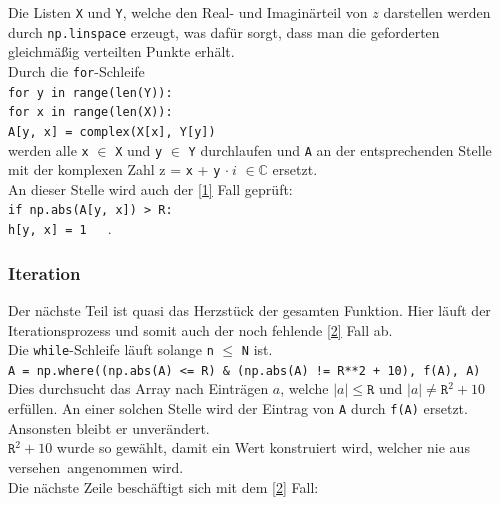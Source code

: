 \documentclass[12pt]{scrartcl}
\newcommand\tab[1][1cm]{\hspace*{#1}}
\begin{document}
Die Listen \texttt{X} und \texttt{Y}, welche den Real- und Imaginärteil von $z$ darstellen werden durch \texttt{np.linspace} erzeugt, was dafür sorgt, dass man die geforderten gleichmäßig verteilten Punkte erhält.\\

Durch die \texttt{for}-Schleife\\

\tab \texttt{for y in range(len(Y)):\\
        \tab \tab for x in range(len(X)):\\
            \tab \tab \tab A[y, x] = complex(X[x], Y[y])}\\

werden alle \texttt{x} $\in$ \texttt{X} und \texttt{y} $\in$ \texttt{Y} durchlaufen und \texttt{A} an der entsprechenden Stelle mit der komplexen Zahl z = \texttt{x} + \texttt{y} $\cdot~i$ $\in \mathbb{C}$ ersetzt.\\

An dieser Stelle wird auch der \ref{1} Fall geprüft:\\

\tab \texttt{if np.abs(A[y, x]) > R:} \\
\tab \tab \texttt{h[y, x] = 1}~~~.\\

\subsubsection{Iteration}\label{Iteration}
Der nächste Teil ist quasi das Herzstück der gesamten Funktion. Hier läuft der Iterationsprozess und somit auch der noch fehlende \ref{2} Fall ab.\\

Die \texttt{while}-Schleife läuft solange \texttt{n} $\leq$ \texttt{N} ist.\\

\tab \texttt{A = np.where((np.abs(A) <= R) \& (np.abs(A) != R**2 + 10), f(A), A)}\\

Dies durchsucht das Array nach Einträgen $a$, welche $|a| \leq \texttt{R}$ und $|a| \neq \texttt{R}^2 + 10$ erfüllen. An einer solchen Stelle wird der Eintrag von \texttt{A} durch \texttt{f(A)} ersetzt. Ansonsten bleibt er unverändert.\\
$\texttt{R}^2 + 10$ wurde so gewählt, damit ein Wert konstruiert wird, welcher nie \glqq aus versehen\grqq ~angenommen wird.\\

Die nächste Zeile beschäftigt sich mit dem \ref{2} Fall:\\
\end{document}
